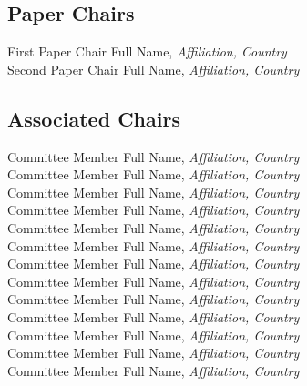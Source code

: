
\subsection{Paper Chairs}
First Paper Chair Full Name, \emph{Affiliation, Country}\\
Second Paper Chair Full Name, \emph{Affiliation, Country}\\


\subsection{Associated Chairs}
Committee Member Full Name, \emph{Affiliation, Country}\\
Committee Member Full Name, \emph{Affiliation, Country}\\
Committee Member Full Name, \emph{Affiliation, Country}\\
Committee Member Full Name, \emph{Affiliation, Country}\\
Committee Member Full Name, \emph{Affiliation, Country}\\
Committee Member Full Name, \emph{Affiliation, Country}\\
Committee Member Full Name, \emph{Affiliation, Country}\\
Committee Member Full Name, \emph{Affiliation, Country}\\
Committee Member Full Name, \emph{Affiliation, Country}\\
Committee Member Full Name, \emph{Affiliation, Country}\\
Committee Member Full Name, \emph{Affiliation, Country}\\
Committee Member Full Name, \emph{Affiliation, Country}\\
Committee Member Full Name, \emph{Affiliation, Country}\\

